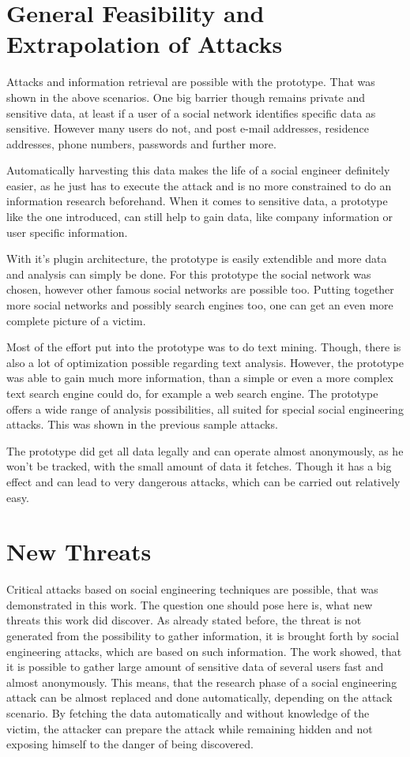 \section{General Feasibility and Extrapolation of Attacks}

Attacks and information retrieval are possible with the prototype. That was
shown in the above scenarios. One big barrier though remains private and
sensitive data, at least if a user of a social network identifies specific data
as sensitive. However many users do not, and post e-mail addresses, residence
addresses, phone numbers, passwords and further more.

Automatically harvesting this data makes the life of a social engineer
definitely easier, as he just has to execute the attack and is no more
constrained to do an information research beforehand. When it comes to
sensitive data, a prototype like the one introduced, can still help to gain
data, like company information or user specific information.

With it's plugin architecture, the prototype is easily extendible and more data
and analysis can simply be done. For this prototype the \Twitter{} social
network was chosen, however other famous social networks are possible too.
Putting together more social networks and possibly search engines too, one can
get an even more complete picture of a victim.

Most of the effort put into the prototype was to do text mining. Though, there is
also a lot of optimization possible regarding text analysis. However, the
prototype was able to gain much more information, than a simple or even a more
complex text search engine could do, for example a web search engine. The prototype
offers a wide range of analysis possibilities, all suited for special social
engineering attacks. This was shown in the previous sample attacks.

The prototype did get all data legally and can operate almost anonymously, as
he won't be tracked, with the small amount of data it fetches. Though it has
a big effect and can lead to very dangerous attacks, which can be carried out
relatively easy.

\section{New Threats}

Critical attacks based on social engineering techniques are possible, that was
demonstrated in this work. The question one should pose here is, what new
threats this work did discover. As already stated before, the threat is not
generated from the possibility to gather information, it is brought forth by
social engineering attacks, which are based on such information. The work
showed, that it is possible to gather large amount of sensitive data of several
users fast and almost anonymously. This means, that the research phase of a
social engineering attack can be almost replaced and done automatically,
depending on the attack scenario. By fetching the data automatically and
without knowledge of the victim, the attacker can prepare the attack while
remaining hidden and not exposing himself to the danger of being discovered.

